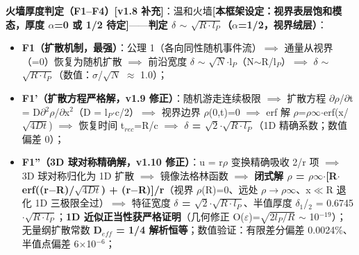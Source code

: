 \documentclass[UTF8,fontset=windows]{csoarticle}
\newcommand{\mtag}[1]{\textbf{[#1]}}
\newcommand{\up}[1]{\ensuremath{^{#1}}}
\newcommand{\down}[1]{\ensuremath{_{#1}}}
\begin{document}
\textbf{火墙厚度判定（F1--F4）\mtag{v1.8 补充}}：温和火墙\mtag{本框架设定：视界表层饱和模态，厚度 \ensuremath{\alpha}=0 或 1/2 待定}------\textbf{判定 \ensuremath{\delta} \ensuremath{\sim} \ensuremath{\sqrt{R\cdot{}l\down{P}}}（\ensuremath{\alpha}=1/2，视界绒层）}：
\begin{itemize}
\item \textbf{F1（扩散机制，最强）}：公理 1（各向同性随机事件流）\ensuremath{\implies} 通量从视界（=0）恢复为随机扩散 \ensuremath{\implies} 前沿宽度 \ensuremath{\delta} \ensuremath{\sim} \ensuremath{\sqrt{N}}\ensuremath{\cdot}l\down{P}（N\ensuremath{\sim}R/l\down{P}）\ensuremath{\implies} \ensuremath{\delta} \ensuremath{\sim} \ensuremath{\sqrt{R\cdot{}l\down{P}}}（数值：\ensuremath{\sigma}/\ensuremath{\sqrt{N}} \ensuremath{\approx} 1.0）；
\item \textbf{F1'（扩散方程严格解，v1.9 修正）}：随机游走连续极限 \ensuremath{\implies} 扩散方程 \ensuremath{\partial}\ensuremath{\rho}/\ensuremath{\partial}t = D\ensuremath{\partial}\up{2}\ensuremath{\rho}/\ensuremath{\partial}x\up{2}（D = l\down{P}\ensuremath{\cdot}c/2）\ensuremath{\implies} 视界边界 \ensuremath{\rho}(0,t)=0 \ensuremath{\implies} erf 解 \ensuremath{\rho}=\ensuremath{\rho}\ensuremath{\infty}\ensuremath{\cdot}erf(x/\ensuremath{\sqrt{4Dt}}) \ensuremath{\implies} 恢复时间 t\down{rec}=R/c \ensuremath{\implies} \textbf{\ensuremath{\delta} = \ensuremath{\sqrt{2}}\ensuremath{\cdot}\ensuremath{\sqrt{R\cdot{}l\down{P}}}}（1D 精确系数；数值偏差 0）；
\item \textbf{F1''（3D 球对称精确解，v1.10 修正）}：u = r\ensuremath{\rho} 变换精确吸收 2/r 项 \ensuremath{\implies} 3D 球对称归化为 1D 扩散 \ensuremath{\implies} 镜像法格林函数 \ensuremath{\implies} \textbf{闭式解 \ensuremath{\rho} = \ensuremath{\rho}\ensuremath{\infty}\ensuremath{\cdot}[R\ensuremath{\cdot}erf((r\ensuremath{-}R)/\ensuremath{\sqrt{4Dt}}) + (r\ensuremath{-}R)]/r}（视界 \ensuremath{\rho}(R)=0、远处 \ensuremath{\rho}\ensuremath{\to}\ensuremath{\rho}\ensuremath{\infty}、x\ensuremath{\ll}R 退化 1D 三极限全过）\ensuremath{\implies} 特征宽度 \textbf{\ensuremath{\delta} = \ensuremath{\sqrt{2}}\ensuremath{\cdot}\ensuremath{\sqrt{R\cdot{}l\down{P}}}}、半值厚度 \ensuremath{\delta}\down{1}/\down{2} = 0.6745\ensuremath{\cdot}\ensuremath{\sqrt{R\cdot{}l\down{P}}}；\textbf{1D 近似正当性获严格证明}（几何修正 O(\ensuremath{\varepsilon})=\ensuremath{\sqrt{2l\down{P}/R}} \ensuremath{\sim} 10\up{-19}）；无量纲扩散常数 \textbf{D\down{eff} = 1/4 解析恒等}；数值验证：有限差分偏差 0.0024\%、半值点偏差 6\ensuremath{\times}10\up{-6}；

\end{itemize}
\end{document}
